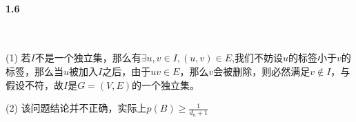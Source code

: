 \paragraph{1.6}~{}

(1)
若$I$不是一个独立集，那么有$\exists u,v\in I,(u,v)\in E$,我们不妨设$u$的标签小于$v$的标签，那么当$u$被加入$I$之后，由于$uv \in E$，那么$v$会被删除，则必然满足$v \notin I$，与假设不符，故$I$是$G=(V,E)$的一个独立集。

(2)
该问题结论并不正确，实际上$p(B)\ge \frac{1}{d_u+1}$